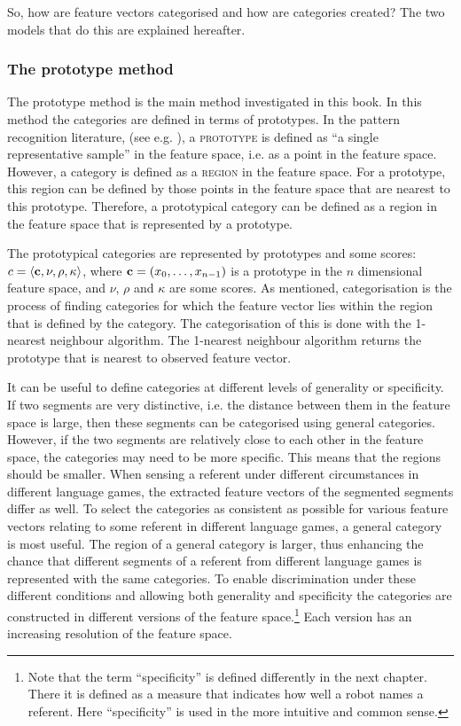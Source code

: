 So, how are feature vectors categorised and how are categories created? The two models that do this are explained hereafter.

\subsubsection{The prototype method}\label{s:cm:prototype}

The prototype method is the main method investigated in this book. In this method the categories are defined in terms of prototypes. In the pattern recognition literature, (see e.g. \citealt{banks:1990}), a {\scshape prototype} is defined as ``a single representative sample'' in the feature space, i.e. as a point in the feature space. However, a category is defined as a {\scshape region} in the feature space. For a prototype, this region can be defined by those points in the feature space that are nearest to this prototype. Therefore, a prototypical category can be defined as a region in the feature space that is represented by a prototype.

The prototypical categories are represented by prototypes and some scores: $c=\langle {\bf c},\nu,\rho,\kappa \rangle$, where ${\bf c}=(x_0,\ldots,x_{n-1})$ is a prototype in the $n$ dimensional feature space, and $\nu$, $\rho$ and $\kappa$ are some scores. As mentioned, categorisation is the process of finding categories for which the feature vector lies within the region that is defined by the category. The categorisation of this is done with the 1-nearest neighbour algorithm. The 1-nearest neighbour algorithm returns the prototype that is nearest to observed feature vector. 

It can be useful to define categories at different levels of generality or specificity. If two segments are very distinctive, i.e. the distance between them in the feature space is large, then these segments can be categorised using general categories. However, if the two segments are relatively close to each other in the feature space, the categories may need to be more specific. This means that the regions should be smaller. When sensing a referent under different circumstances in different language games, the extracted feature vectors of the segmented segments differ as well. To select the categories as consistent as possible for various feature vectors relating to some referent in different language games, a general category is most useful. The region of a general category is larger, thus enhancing the chance that different segments of a referent from different language games is represented with the same categories. To enable discrimination under these different conditions and allowing both generality and specificity the categories are constructed in different versions of the feature space.\footnote{Note that the term ``specificity'' is defined differently in the next chapter. There it is defined as a measure that indicates how well a robot names a referent. Here ``specificity'' is used in the more intuitive and common sense.} Each version has an increasing resolution of the feature space.

